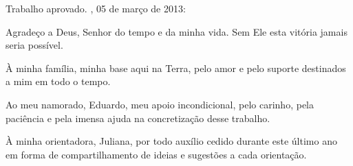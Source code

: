 \documentclass[12pt,oneside,a4paper,english,french,spanish]{abntex2}
\begin{document}

%
% 
%
\begin{folhadeaprovacao}

  \begin{center}
    {\ABNTEXchapterfont\large\imprimirautor}

    \vspace*{\fill}\vspace*{\fill}
    {\ABNTEXchapterfont\bfseries\Large\imprimirtitulo}
    \vspace*{\fill}
    
    \hspace{.45\textwidth}
    \begin{minipage}{.5\textwidth}
        \imprimirpreambulo
    \end{minipage}%
    \vspace*{\fill}
  \end{center}
    
  Trabalho aprovado. \imprimirlocal, 05 de março de 2013:

      
  \begin{center}
    \vspace*{0.5cm}
    {\large\imprimirlocal}
    \par
    {\large\imprimirdata}
    \vspace*{1cm}
  \end{center}
  
\end{folhadeaprovacao}


\begin{agradecimentos}
Agradeço a Deus, Senhor do tempo e da minha vida. Sem Ele esta vitória jamais seria possível. 

À minha família, minha base aqui na Terra, pelo amor e pelo suporte destinados a mim em todo o tempo.

Ao meu namorado, Eduardo, meu apoio incondicional, pelo carinho, pela paciência e pela imensa ajuda na concretização desse trabalho.

À minha orientadora, Juliana, por todo auxílio cedido durante este último ano em forma de compartilhamento de ideias e sugestões a cada orientação.
\end{agradecimentos}
\end{document}
